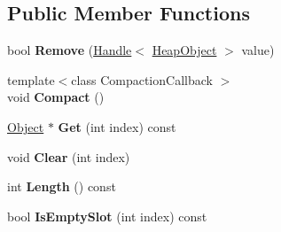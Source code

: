 \subsection*{Public Member Functions}
\begin{DoxyCompactItemize}
\item 
bool {\bfseries Remove} (\hyperlink{classv8_1_1internal_1_1_handle}{Handle}$<$ \hyperlink{classv8_1_1internal_1_1_heap_object}{Heap\+Object} $>$ value)\hypertarget{classv8_1_1internal_1_1_weak_fixed_array_af5f48eab1a58f76d7162868d95e5478a}{}\label{classv8_1_1internal_1_1_weak_fixed_array_af5f48eab1a58f76d7162868d95e5478a}

\item 
{\footnotesize template$<$class Compaction\+Callback $>$ }\\void {\bfseries Compact} ()\hypertarget{classv8_1_1internal_1_1_weak_fixed_array_a3ff51a55bcaf6253156495aa9a02a010}{}\label{classv8_1_1internal_1_1_weak_fixed_array_a3ff51a55bcaf6253156495aa9a02a010}

\item 
\hyperlink{classv8_1_1internal_1_1_object}{Object} $\ast$ {\bfseries Get} (int index) const \hypertarget{classv8_1_1internal_1_1_weak_fixed_array_abd035eefa1d5b71727d4060243544e00}{}\label{classv8_1_1internal_1_1_weak_fixed_array_abd035eefa1d5b71727d4060243544e00}

\item 
void {\bfseries Clear} (int index)\hypertarget{classv8_1_1internal_1_1_weak_fixed_array_a0088d20aba3f0c52487d8a1dc1804a4a}{}\label{classv8_1_1internal_1_1_weak_fixed_array_a0088d20aba3f0c52487d8a1dc1804a4a}

\item 
int {\bfseries Length} () const \hypertarget{classv8_1_1internal_1_1_weak_fixed_array_a20f00d4ee43501a343343daa6a8b19e8}{}\label{classv8_1_1internal_1_1_weak_fixed_array_a20f00d4ee43501a343343daa6a8b19e8}

\item 
bool {\bfseries Is\+Empty\+Slot} (int index) const \hypertarget{classv8_1_1internal_1_1_weak_fixed_array_a46be56e2edbbd25db3d04ca52dbbcd28}{}\label{classv8_1_1internal_1_1_weak_fixed_array_a46be56e2edbbd25db3d04ca52dbbcd28}

\end{DoxyCompactItemize}
